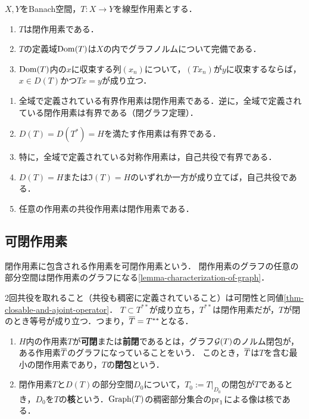 \documentclass[uplatex,dvipdfmx]{jsreport}
\begin{document}
\begin{lemma}[閉作用素の特徴付け]
    $X,Y$をBanach空間，$T:X\to Y$を線型作用素とする．
    \begin{enumerate}
        \item $T$は閉作用素である．
        \item $T$の定義域$\mathrm{Dom}(T)$は$X$の内でグラフノルムについて完備である．
        \item $\mathrm{Dom}(T)$内の$x$に収束する列$(x_n)$について，$(Tx_n)$が$y$に収束するならば，$x\in D(T)$かつ$Tx=y$が成り立つ．
    \end{enumerate}
\end{lemma}
\begin{example}\mbox{}
    \begin{enumerate}
        \item 全域で定義されている有界作用素は閉作用素である．逆に，全域で定義されている閉作用素は有界である（閉グラフ定理）．
        \item $D(T)=D(T^*)=H$を満たす作用素は有界である．
        \item 特に，全域で定義されている対称作用素は，自己共役で有界である．
        \item $D(T)=H$または$\Im(T)=H$のいずれか一方が成り立てば，自己共役である．
        \item 任意の作用素の共役作用素は閉作用素である．
    \end{enumerate}
\end{example}

\subsection{可閉作用素}

\begin{tcolorbox}[colframe=ForestGreen, colback=ForestGreen!10!white,breakable,colbacktitle=ForestGreen!40!white,coltitle=black,fonttitle=\bfseries\sffamily,
title=]
    閉作用素に包含される作用素を可閉作用素という．
    閉作用素のグラフの任意の部分空間は閉作用素のグラフになる\ref{lemma-characterization-of-graph}．

    2回共役を取れること（共役も稠密に定義されていること）は可閉性と同値\ref{thm-closable-and-ajoint-operator}．
    $T\subset T^{**}$が成り立ち，$T^{**}$は閉作用素だが，$T$が閉のとき等号が成り立つ．つまり，$\overline{T}=T^{**}$となる．
\end{tcolorbox}

\begin{definition}\mbox{}
    \begin{enumerate}
        \item $H$内の作用素$T$が\textbf{可閉}または\textbf{前閉}であるとは，グラフ$\mathcal{G}(T)$のノルム閉包が，ある作用素$\overline{T}$のグラフになっていることをいう．
        このとき，$\overline{T}$は$T$を含む最小の閉作用素であり，$T$の\textbf{閉包}という．
        \item 閉作用素$T$と$D(T)$の部分空間$D_0$について，$T_0:=T|_{D_0}$の閉包が$T$であるとき，$D_0$を$T$の\textbf{核}という．$\mathrm{Graph}(T)$の稠密部分集合の$\mathrm{pr}_1$による像は核である．
    \end{enumerate}
\end{definition}
\end{document}
